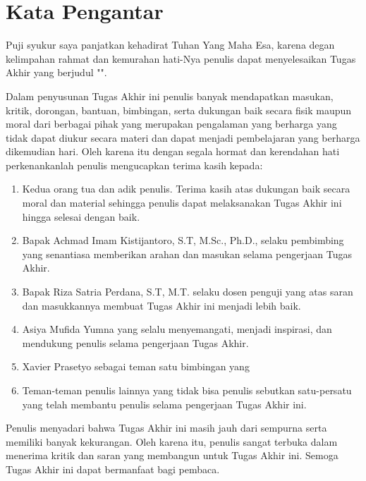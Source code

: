\chapter*{Kata Pengantar}

Puji syukur saya panjatkan kehadirat Tuhan Yang Maha Esa, karena degan kelimpahan rahmat dan kemurahan hati-Nya penulis dapat menyelesaikan Tugas Akhir yang berjudul "\thetitle".

Dalam penyusunan Tugas Akhir ini penulis banyak mendapatkan masukan, kritik, dorongan, bantuan, bimbingan, serta dukungan baik secara fisik maupun moral dari berbagai pihak yang merupakan pengalaman yang berharga yang tidak dapat diukur secara materi dan dapat menjadi pembelajaran yang berharga dikemudian hari. Oleh karena itu dengan segala hormat dan kerendahan hati perkenankanlah penulis mengucapkan terima kasih kepada:

\begin{enumerate}
	\item Kedua orang tua dan adik penulis. Terima kasih atas dukungan baik secara moral dan material sehingga penulis dapat melaksanakan Tugas Akhir ini hingga selesai dengan baik.
	\item Bapak Achmad Imam Kistijantoro, S.T, M.Sc., Ph.D., selaku pembimbing yang senantiasa memberikan arahan dan masukan selama pengerjaan Tugas Akhir.
	\item Bapak Riza Satria Perdana, S.T, M.T. selaku dosen penguji yang atas saran dan masukkannya membuat Tugas Akhir ini menjadi lebih baik.
	
	\item Asiya Mufida Yumna yang selalu menyemangati, menjadi inspirasi, dan mendukung penulis selama pengerjaan Tugas Akhir.	
	\item Xavier Prasetyo sebagai teman satu bimbingan yang 
	\item Teman-teman penulis lainnya yang tidak bisa penulis sebutkan satu-persatu yang telah membantu penulis selama pengerjaan Tugas Akhir ini.
\end{enumerate}

Penulis menyadari bahwa Tugas Akhir ini masih jauh dari sempurna serta memiliki banyak kekurangan. Oleh karena itu, penulis sangat terbuka dalam menerima kritik dan saran yang membangun untuk Tugas Akhir ini. Semoga Tugas Akhir ini dapat bermanfaat bagi pembaca.

